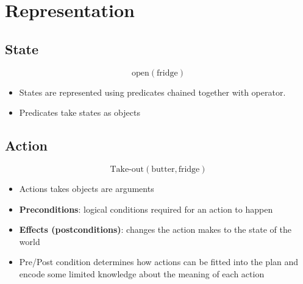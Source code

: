\section{Representation}

  \subsection{State}

    \begin{equation}
      \text{open}\left( \text{fridge} \right)
    \end{equation}

    \begin{itemize}
      \item States are represented using predicates chained together with operator.
      \item Predicates take states as objects
    \end{itemize}

  \subsection{Action}

    \begin{equation}
      \text{Take-out}\left( \text{butter}, \text{fridge} \right)
    \end{equation}

    \begin{itemize}
      \item Actions takes objects are arguments
      \item \textbf{Preconditions}: logical conditions required for an action
      to happen
      \item \textbf{Effects (postconditions)}: changes the action makes to the
      state of the world
      \item Pre/Post condition determines how actions can be fitted into the
      plan and encode some limited knowledge about the meaning of each action
    \end{itemize}